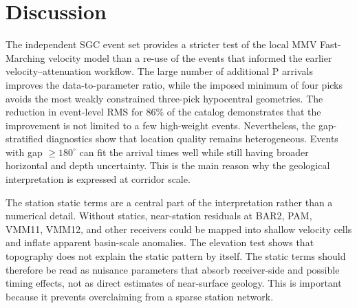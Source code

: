 \documentclass[review,authoryear]{elsarticle}
\begin{document}
\FloatBarrier
\section{Discussion}
The independent SGC event set provides a stricter test of the local MMV Fast-Marching velocity model \citep{MMVFMMVelocityAttenuationInPrep} than a re-use of the events that informed the earlier velocity--attenuation workflow. The large number of additional P arrivals improves the data-to-parameter ratio, while the imposed minimum of four picks avoids the most weakly constrained three-pick hypocentral geometries. The reduction in event-level RMS for 86\% of the catalog demonstrates that the improvement is not limited to a few high-weight events. Nevertheless, the gap-stratified diagnostics show that location quality remains heterogeneous. Events with gap $\geq180^\circ$ can fit the arrival times well while still having broader horizontal and depth uncertainty. This is the main reason why the geological interpretation is expressed at corridor scale.

The station static terms are a central part of the interpretation rather than a numerical detail. Without statics, near-station residuals at BAR2, PAM, VMM11, VMM12, and other receivers could be mapped into shallow velocity cells and inflate apparent basin-scale anomalies. The elevation test shows that topography does not explain the static pattern by itself. The static terms should therefore be read as nuisance parameters that absorb receiver-side and possible timing effects, not as direct estimates of near-surface geology. This is important because it prevents overclaiming from a sparse station network.
\end{document}
